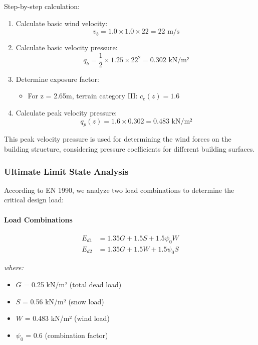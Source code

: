 \documentclass[12pt,a4paper]{article}
\begin{document}
\noindent
Step-by-step calculation:
\begin{enumerate}
    \item Calculate basic wind velocity:
        \begin{equation}
        v_b = 1.0 \times 1.0 \times 22 = 22 \text{ m/s}
        \end{equation}
    
    \item Calculate basic velocity pressure:
        \begin{equation}
        q_b = \frac{1}{2} \times 1.25 \times 22^2 = 0.302 \text{ kN/m²}
        \end{equation}
    
    \item Determine exposure factor:
        \begin{itemize}
            \item For z = 2.65m, terrain category III: $c_e(z) = 1.6$
        \end{itemize}
    
    \item Calculate peak velocity pressure:
        \begin{equation}
        q_p(z) = 1.6 \times 0.302 = 0.483 \text{ kN/m²}
        \end{equation}
\end{enumerate}

This peak velocity pressure is used for determining the wind forces on the building structure, considering pressure coefficients for different building surfaces.

\subsubsection{Ultimate Limit State Analysis}
According to EN 1990, we analyze two load combinations to determine the critical design load:

\paragraph{Load Combinations}
\begin{equation}
\begin{aligned}
E_{d1} &= 1.35G + 1.5S + 1.5\psi_0W \\
E_{d2} &= 1.35G + 1.5W + 1.5\psi_0S
\end{aligned}
\end{equation}

\noindent
\textit{where:}
\begin{itemize}
    \item $G$ = 0.25 kN/m² (total dead load)
    \item $S$ = 0.56 kN/m² (snow load)
    \item $W$ = 0.483 kN/m² (wind load)
    \item $\psi_0$ = 0.6 (combination factor)
\end{itemize}
\end{document}
